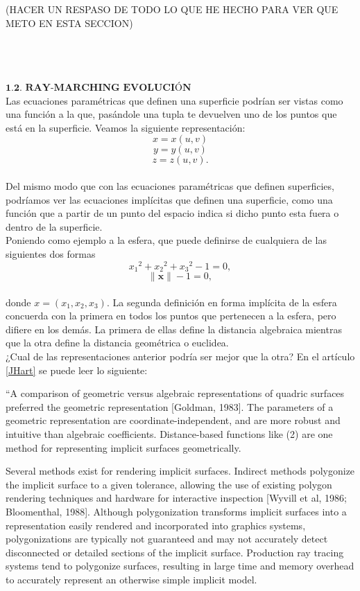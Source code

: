 (HACER UN RESPASO DE TODO LO QUE HE HECHO PARA VER QUE METO EN ESTA SECCION)


${ }$\\
${ }$\\
${ }$\\
$\textbf{1.2. RAY-MARCHING EVOLUCIÓN}$
${ }$\\

Las ecuaciones paramétricas que definen una superficie podrían ser vistas como una función a la que, pasándole una tupla te devuelven uno de los puntos que está en la superficie. Veamos la siguiente representación:
${ }$\\
$$ x = x(u,v) $$
$$ y = y(u,v) $$
$$ z = z(u,v). $$
${ }$\\
Del mismo modo que con las ecuaciones paramétricas que definen superficies, podríamos ver las ecuaciones implícitas que definen una superficie, como una función que a partir de un punto del espacio indica si dicho punto esta fuera o dentro de la superficie.
${ }$\\

Poniendo como ejemplo a la esfera, que puede definirse de cualquiera de las siguientes dos formas
${ }$\\
$$ {x_1}^2 + {x_2}^2 + {x_3}^2 -1 = 0, $$
$$ \lVert \mathbf{x} \rVert -1 = 0, $$
${ }$\\
donde $x = (x_1, x_2, x_3)$. La segunda definición en forma implícita de la esfera concuerda con la primera en todos los puntos que pertenecen a la esfera, pero difiere en los demás. La primera de ellas define la distancia algebraica mientras que la otra define la distancia geométrica o euclidea.
${ }$\\

¿Cual de las representaciones anterior podría ser mejor que la otra? En el artículo \ref{JHart} se puede leer lo siguiente:

``A comparison of geometric versus algebraic representations of quadric surfaces preferred the geometric representation [Goldman, 1983]. The parameters of a geometric representation are coordinate-independent, and are more robust and intuitive than algebraic coefficients. Distance-based functions like (2) are one method for representing implicit surfaces geometrically.

Several methods exist for rendering implicit surfaces. Indirect methods polygonize the implicit surface to a given tolerance, allowing the use of existing polygon rendering techniques and hardware for interactive inspection [Wyvill et al, 1986; Bloomenthal, 1988]. Although polygonization transforms implicit surfaces into a representation easily rendered and incorporated into graphics systems, polygonizations are typically not guaranteed and may not accurately detect disconnected or detailed sections of the implicit surface. Production ray tracing systems tend to polygonize surfaces, resulting in large time and memory overhead to accurately represent an otherwise simple implicit model.

